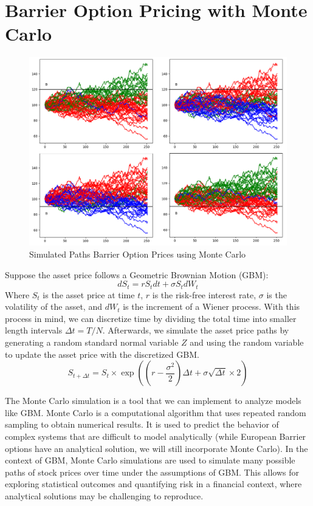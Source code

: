 \chapter{Barrier Option Pricing with Monte Carlo}

\begin{figure}[h]
	\centering
	\includegraphics[width=.65\linewidth]{content/images/monte_carlo_paths.png}
	\caption{Simulated Paths Barrier Option Prices using Monte Carlo}
	\label{fig:monte_carlo_paths}
\end{figure}
Suppose the asset price follows a Geometric Brownian Motion (GBM):
\begin{equation}\label{eq:GBM}
	dS_t=rS_tdt+\sigma S_tdW_t
\end{equation}
Where $S_t$ is the asset price at time $t$, $r$ is the risk-free interest rate, $\sigma$ is the volatility of the asset, and $dW_t$ is the increment of a Wiener process. With this process in mind, we can discretize time by dividing the total time into smaller length intervals $\Delta t=T/N.$ Afterwards, we simulate the asset price paths by generating a random standard normal variable $Z$ and using the random variable to update the asset price with the discretized GBM. 
\begin{equation}
	S_{t+\Delta t}=S_t\times\exp\left(\left(r-\frac{\sigma^2}{2}\right)\Delta t+\sigma\sqrt{\Delta t}\times 2\right)
\end{equation}

The Monte Carlo simulation is a tool that we can implement to analyze models like GBM. Monte Carlo is a computational algorithm that uses repeated random sampling to obtain numerical results. It is used to predict the behavior of complex systems that are difficult to model analytically (while European Barrier options have an analytical solution, we will still incorporate Monte Carlo). In the context of GBM, Monte Carlo simulations are used to simulate many possible paths of stock prices over time under the assumptions of GBM. This allows for exploring statistical outcomes and quantifying risk in a financial context, where analytical solutions may be challenging to reproduce. 

